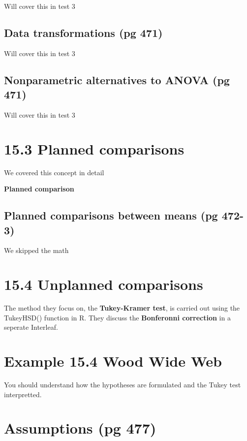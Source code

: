 \documentclass[]{book}
\theoremstyle{definition}
\theoremstyle{definition}
\theoremstyle{definition}
\theoremstyle{remark}
\begin{document}
Will cover this in test 3

\subsection{Data transformations (pg
471)}\label{data-transformations-pg-471}

Will cover this in test 3

\subsection{Nonparametric alternatives to ANOVA (pg
471)}\label{nonparametric-alternatives-to-anova-pg-471}

Will cover this in test 3

\section{15.3 Planned comparisons}\label{planned-comparisons}

We covered this concept in detail

\textbf{Planned comparison}

\subsection{Planned comparisons between means (pg
472-3)}\label{planned-comparisons-between-means-pg-472-3}

We skipped the math

\section{15.4 Unplanned comparisons}\label{unplanned-comparisons}

The method they focus on, the \textbf{Tukey-Kramer test}, is carried out
using the TukeyHSD() function in R. They discuss the \textbf{Bonferonni
correction} in a seperate Interleaf.

\section{Example 15.4 Wood Wide Web}\label{example-15.4-wood-wide-web}

You should understand how the hypotheses are formulated and the Tukey
test interpretted.

\section{Assumptions (pg 477)}\label{assumptions-pg-477}
\end{document}
